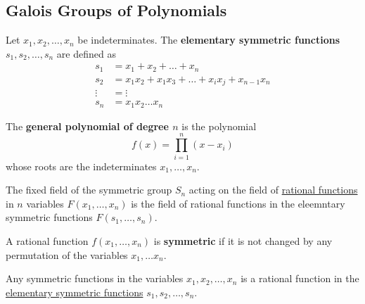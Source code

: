 \subsection{Galois Groups of Polynomials} 

  \begin{definition}
    \label{def:elementary-symmetric-functions}
 
    Let $x_1, x_2, \ldots, x_n$ be indeterminates. The \textbf{elementary symmetric functions} $s_1, s_2, \ldots, s_n$ are defined as 
    \begin{align}
      s_1 & = x_1 + x_2 + \ldots + x_n \\ 
      s_2 & = x_1 x_2 + x_1 x_3 + \ldots + x_i x_j + x_{n-1} x_n \\ 
      \vdots & = \vdots \\
      s_n & = x_1 x_2 \ldots x_n
    \end{align}
  \end{definition}

  \begin{definition}
    \label{def:general-polynomial-of-degree-n}
    The \textbf{general polynomial of degree $n$} is the polynomial 
    \begin{equation}
      f(x) = \prod_{i=1}^n (x - x_i)
    \end{equation}
    whose roots are the indeterminates $x_1, \ldots, x_n$.  
  \end{definition}

  \begin{theorem}
    \label{thm:fixed-field-symmetric-group-acting}
    The fixed field of the symmetric group $S_n$ acting on the field of \hyperref[def:rational-functions]{rational functions} in $n$ variables $F(x_1, \ldots, x_n)$ is the field of rational functions in the eleemntary symmetric functions $F(s_1, \ldots, s_n)$. 
  \end{theorem}

  \begin{definition}[Symmetric]
    \label{def:symmetric}
    A rational function $f(x_1, \ldots, x_n)$ is \textbf{symmetric} if it is not changed by any permutation of the variables $x_1, \ldots x_n$. 
  \end{definition}

  \begin{theorem}
    \label{thm:fundamental-theorem-on-symmetric-functions}
    Any symmetric functions in the variables $x_1, x_2, \ldots, x_n$ is a rational function in the \hyperref[def:elementary-symmetric-functions]{elementary symmetric functions} $s_1, s_2, \ldots, s_n$. 
  \end{theorem}

